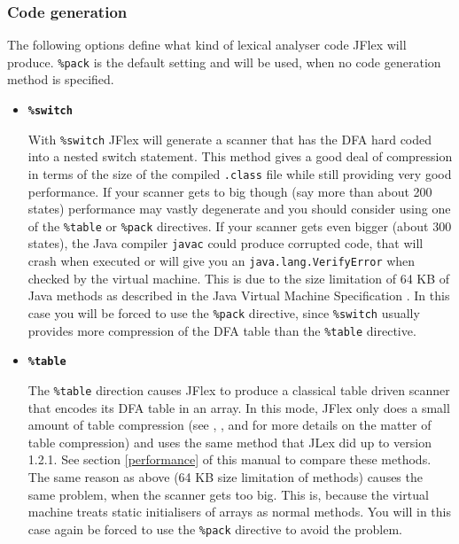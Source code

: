\documentclass[11pt]{scrartcl}
\begin{document}
\subsubsection{Code generation\label{CodeGeneration}}
The following options define what kind of lexical analyser code JFlex
will produce. \texttt{\%pack} is the default setting and will be used,
when no code generation method is specified.
 
\begin{itemize}
\item 
  {\bf \tt \%switch}

  With \texttt{\%switch} JFlex will generate a scanner that has
  the DFA hard coded into a nested switch statement. This method gives
  a good deal of compression in terms of the size of the compiled 
  \texttt{.class} file while still providing very good performance. If your
  scanner gets to big though (say more than about 200 states)
  performance may vastly degenerate and you should consider using one
  of the \texttt{\%table} or \texttt{\%pack} directives. If your scanner
  gets even bigger (about 300 states), the Java compiler \texttt{javac}
  could produce corrupted code, that will crash when executed or will
  give you an \texttt{java.lang.VerifyError} when checked by the virtual
  machine. This is due to the size limitation of 64 KB of Java
  methods as described in the Java Virtual Machine Specification
  \cite{MachineSpec}. In this case you will be forced to use the 
  \texttt{\%pack} directive, since \texttt{\%switch}
  usually provides more compression of the DFA table than the 
  \texttt{\%table} directive.

 
\item
  {\bf \texttt{\%table}}
  
  The \texttt{\%table} direction causes JFlex to produce a classical
  table driven scanner that encodes its DFA table in an array.  In
  this mode, JFlex only does a small amount of table compression (see
  \cite{ParseTable}, \cite{SparseTable}, \cite{Aho} and \cite{Maurer}
  for more details on the matter of table compression) and uses the
  same method that JLex did up to version 1.2.1. See section \ref{performance}
   of this manual to compare
  these methods. The same reason as above (64 KB size limitation of
  methods) causes the same problem, when the scanner gets too big.
  This is, because the virtual machine treats static initialisers of
  arrays as normal methods. You will in this case again be forced to
  use the \texttt{\%pack} directive to avoid the problem.
 

\end{itemize}
\end{document}
